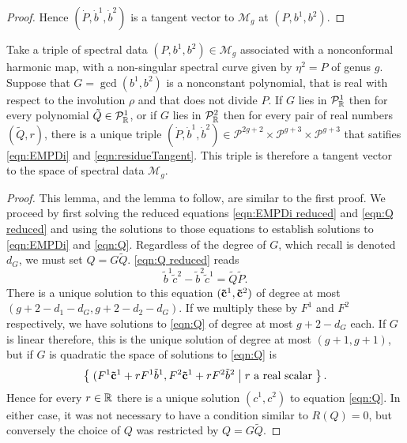 \begin{lem}[Case (i)]
\begin{proof}
Hence $(\dot{P},\dot{b}^1,\dot{b}^2)$ is a tangent vector to $\mathcal{M}_g$ at $(P,b^1,b^2)$.
\end{proof}
\end{lem}










\begin{lem}[Case (ii)]
    \label{lem:tangent G}
Take a triple of spectral data $(P,b^1,b^2)\in\mathcal{M}_g$ associated with a nonconformal harmonic map, with a non-singular spectral curve given by $η^2 = P$ of genus $g$. Suppose that $G = \gcd(b^1,b^2)$ is a nonconstant polynomial, that is real with respect to the involution $ρ$ and that does not divide $P$. If $G$ lies in $\mathcal{P}^1_\R$ then for every polynomial $\tilde{Q}\in\mathcal{P}^1_\R$, or if $G$ lies in $\mathcal{P}^2_\R$ then for every pair of real numbers $(\tilde{Q},r)$, there is a unique triple $(\dot P, \dot b^1, \dot b^2) \in \mathcal{P}^{2g+2}\times\mathcal{P}^{g+3}\times\mathcal{P}^{g+3}$ that satifies \eqref{eqn:EMPDi} and \eqref{eqn:residueTangent}. This triple is therefore a tangent vector to the space of spectral data $\mathcal{M}_g$.

\begin{proof}
This lemma, and the lemma to follow, are similar to the first proof. We proceed by first solving the reduced equations \eqref{eqn:EMPDi reduced} and \eqref{eqn:Q reduced} and using the solutions to those equations to establish solutions to \eqref{eqn:EMPDi} and \eqref{eqn:Q}. Regardless of the degree of $G$, which recall is denoted $d_G$, we must set $Q = G\tilde{Q}$. \eqref{eqn:Q reduced} reads
\[
\tilde{b}^1\tilde{c}^2 - \tilde{b}^2\tilde{c}^1 = \tilde{Q}\tilde{P}.
\]
There is a unique solution to this equation $({\bf \tilde{c}}^1,{\bf \tilde{c}}^2)$ of degree at most $(g+2-d_1-d_G,g+2-d_2-d_G)$. If we multiply these by $F^1$ and $F^2$ respectively, we have solutions to \eqref{eqn:Q} of degree at most $g+2-d_G$ each. If $G$ is linear therefore, this is the unique solution of degree at most $(g+1,g+1)$, but if $G$ is quadratic the space of solutions to \eqref{eqn:Q} is
\[
\left\{\;  (F^1{\bf \tilde{c}}^1 + rF^1\tilde{b}^1, F^2{\bf \tilde{c}}^1 + rF^2\tilde{b}^2  \;\middle|\;  r \text{ a real scalar}  \;\right\}.
\]
Hence for every $r\in\R$ there is a unique solution $(c^1, c^2)$ to equation \eqref{eqn:Q}. In either case, it was not necessary to have a condition similar to $R(Q)=0$, but conversely the choice of $Q$ was restricted by $Q = G\tilde{Q}$.


\end{proof}
\end{lem}
